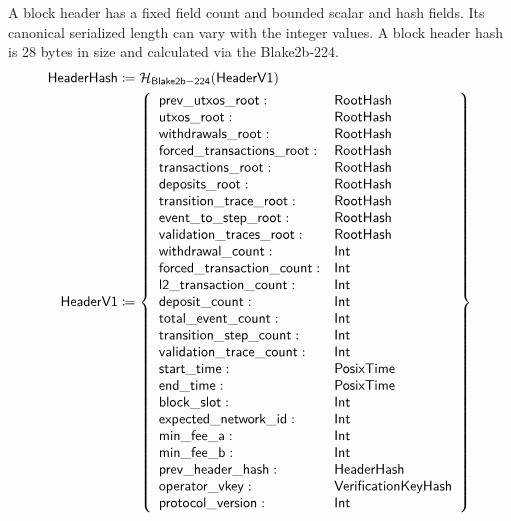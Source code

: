 \documentclass[../midgard.tex]{subfiles}
\begin{document}
A block header has a fixed field count and bounded scalar and hash fields.
Its canonical serialized length can vary with the integer values.
A block header hash is 28 bytes in size and calculated via the Blake2b-224.
\begin{equation*}
\begin{split}
  \mathsf{HeaderHash} &\coloneq \mathcal{H}_{\mathsf{Blake2b-224}}(\mathsf{HeaderV1}) \\
  \mathsf{HeaderV1} &\coloneq \left\{
    \begin{array}{ll}
        \mathsf{prev\_utxos\_root} : & \mathsf{RootHash} \\
        \mathsf{utxos\_root} : & \mathsf{RootHash} \\
        \mathsf{withdrawals\_root} : & \mathsf{RootHash} \\
        \mathsf{forced\_transactions\_root} : & \mathsf{RootHash} \\
        \mathsf{transactions\_root} : & \mathsf{RootHash} \\
        \mathsf{deposits\_root} : & \mathsf{RootHash} \\
        \mathsf{transition\_trace\_root} : & \mathsf{RootHash} \\
        \mathsf{event\_to\_step\_root} : & \mathsf{RootHash} \\
        \mathsf{validation\_traces\_root} : & \mathsf{RootHash} \\
        \mathsf{withdrawal\_count} : & \mathsf{Int} \\
        \mathsf{forced\_transaction\_count} : & \mathsf{Int} \\
        \mathsf{l2\_transaction\_count} : & \mathsf{Int} \\
        \mathsf{deposit\_count} : & \mathsf{Int} \\
        \mathsf{total\_event\_count} : & \mathsf{Int} \\
        \mathsf{transition\_step\_count} : & \mathsf{Int} \\
        \mathsf{validation\_trace\_count} : & \mathsf{Int} \\
        \mathsf{start\_time} : & \mathsf{PosixTime} \\
        \mathsf{end\_time} : & \mathsf{PosixTime} \\
        \mathsf{block\_slot} : & \mathsf{Int} \\
        \mathsf{expected\_network\_id} : & \mathsf{Int} \\
        \mathsf{min\_fee\_a} : & \mathsf{Int} \\
        \mathsf{min\_fee\_b} : & \mathsf{Int} \\
        \mathsf{prev\_header\_hash} : & \mathsf{HeaderHash} \\
        \mathsf{operator\_vkey} : & \mathsf{VerificationKeyHash} \\
        \mathsf{protocol\_version} : & \mathsf{Int} \\
    \end{array} \right\}
\end{split}
\end{equation*}
\end{document}
